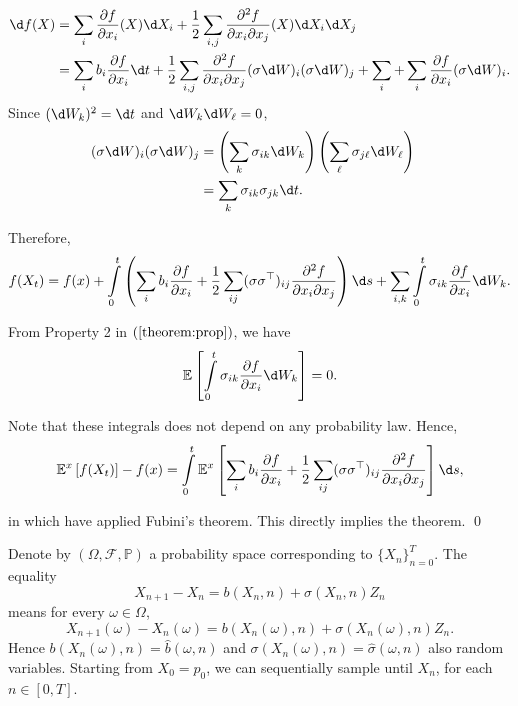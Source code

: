 \begin{align*}
  \d f(X)
   & =\sum\limits_{i}\dfrac{\partial f}{\partial x_i}(X)\d X_i+\dfrac{1}{2}\sum\limits_{i,j}\dfrac{\partial^2 f}{\partial x_i\partial x_j}(X)\d X_i\d X_j                                                                                           \\
   & =\sum\limits_{i}b_i\dfrac{\partial f}{\partial x_i}\d t+\dfrac{1}{2}\sum\limits_{i,j}\dfrac{\partial^2 f}{\partial x_i\partial x_j}(\sigma\d W)_i(\sigma\d W)_j+\sum\limits_{i}+\sum\limits_{i}\dfrac{\partial f}{\partial x_i}(\sigma\d W)_i.
\end{align*}
Since $(\d W_k)^2=\d t$ and $\d W_k\d W_\ell=0$,
\begin{align*}
  (\sigma\d W)_i(\sigma\d W)_j & = \left(\sum\limits_{k}\sigma_{ik}\d W_k\right)\left(\sum\limits_{\ell}\sigma_{j\ell}\d W_\ell\right) & \\
                               & =\sum\limits_k \sigma_{ik} \sigma_{jk}\d t.
\end{align*}

Therefore,
\begin{align*}
  f(X_t)=f(x)+\int\limits_0^t\left(\sum\limits_{i}b_i\dfrac{\partial f}{\partial x_i}+\dfrac{1}{2}\sum\limits_{ij}(\sigma\sigma^\top)_{ij}\dfrac{\partial^2 f}{\partial x_i\partial x_j}\right)\d s + \sum\limits_{i,k}\int\limits_0^t\sigma_{ik}\dfrac{\partial f}{\partial x_i}\d W_k.
\end{align*}

From Property 2 in $(\ref{theorem:prop})$, we have
$$\mathbb{E}\left[\int\limits_0^t\sigma_{ik}\dfrac{\partial f}{\partial x_i}\d W_k\right]=0.$$

Note that these integrals does not depend on any probability law. Hence,
$$\mathbb{E}^x\left[f(X_t)\right] - f(x) = \int\limits_0^t\mathbb{E}^x\left[\sum\limits_{i}b_i\dfrac{\partial f}{\partial x_i}+\dfrac{1}{2}\sum\limits_{ij}(\sigma\sigma^\top)_{ij}\dfrac{\partial^2 f}{\partial x_i\partial x_j}\right]\d s,$$

in which have applied Fubini's theorem. This directly implies the theorem. \qed

Denote by $(\Omega, \mathcal{F}, \mathbb{P})$ a probability space corresponding to $\{X_n\}_{n=0}^T$. The equality
$$X_{n+1} - X_n = b(X_n,n) + \sigma(X_n,n)Z_n$$
means for every $\omega\in\Omega$,
$$X_{n+1}(\omega) - X_n(\omega) = b(X_n(\omega),n) + \sigma(X_n(\omega),n)Z_n.$$
Hence $b(X_n(\omega),n)=\hat{b}(\omega,n)$ and $\sigma(X_n(\omega),n) = \hat{\sigma} (\omega,n)$ also random variables. Starting from $X_0=p_0$, we can sequentially sample until $X_n$, for each $n\in[0,T]$.

